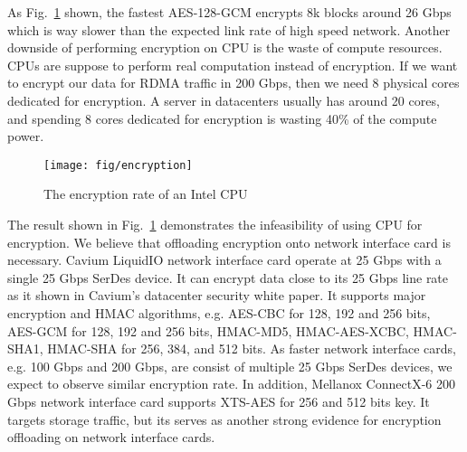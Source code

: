 As Fig.~\ref{fig:cpu_encryption_rate} shown, the fastest AES-128-GCM encrypts 8k blocks around 26 Gbps which is way slower than the expected link rate of high speed network. Another downside of performing encryption on CPU is the waste of compute resources. CPUs are suppose to perform real computation instead of encryption. If we want to encrypt our data for RDMA traffic in 200 Gbps, then we need 8 physical cores dedicated for encryption. A server in datacenters usually has around 20 cores, and spending 8 cores dedicated for encryption is wasting 40\% of the compute power.

\begin{figure}[ht]
    \centering
    \texttt{[image: fig/encryption]}
    \caption{The encryption rate of an Intel CPU}
    \label{fig:cpu_encryption_rate}
\end{figure}

The result shown in Fig.~\ref{fig:cpu_encryption_rate} demonstrates the infeasibility of using CPU for encryption. We believe that offloading encryption onto network interface card is necessary. Cavium LiquidIO network interface card operate at 25 Gbps with a single 25 Gbps SerDes device. It can encrypt data close to its 25 Gbps line rate as it shown in Cavium's datacenter security white paper. It supports major encryption and HMAC algorithms, e.g. AES-CBC for 128, 192 and 256 bits, AES-GCM for 128, 192 and 256 bits, HMAC-MD5, HMAC-AES-XCBC, HMAC-SHA1, HMAC-SHA for 256, 384, and 512 bits. As faster network interface cards, e.g. 100 Gbps and 200 Gbps, are consist of multiple 25 Gbps SerDes devices, we expect to observe similar encryption rate. In addition, Mellanox ConnectX-6 200 Gbps network interface card supports XTS-AES for 256 and 512 bits key. It targets storage traffic, but its serves as another strong evidence for encryption offloading on network interface cards.
